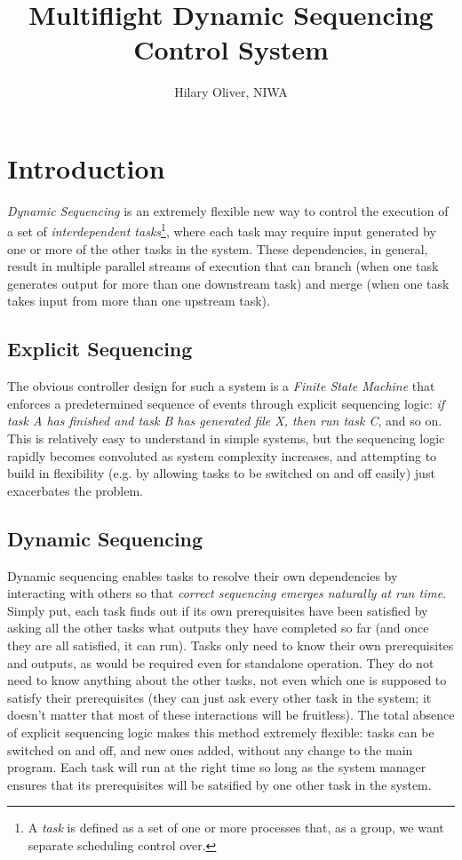 \documentclass[11pt,a4paper]{report}
\title{Multiflight Dynamic Sequencing Control System}
\author{Hilary Oliver, NIWA}
\begin{document}
\maketitle
\tableofcontents


\chapter{Introduction}

{\em Dynamic Sequencing} is an extremely flexible new way to control the
execution of a set of {\em interdependent tasks}\footnote{A {\em task}
is defined as a set of one or more processes that, as a group, we want
separate scheduling control over.}, where each task may require input
generated by one or more of the other tasks in the system. These
dependencies, in general, result in multiple parallel streams of
execution that can branch (when one task generates output for more than
one downstream task) and merge (when one task takes input from more than
one upstream task). 

\section{Explicit Sequencing}

The obvious controller design for such a system is a {\em Finite State
Machine} that enforces a predetermined sequence of events through
explicit sequencing logic: {\em if task A has finished and task B has
generated file X, then run task C}, and so on. This is relatively easy
to understand in simple systems, but the sequencing logic rapidly
becomes convoluted as system complexity increases, and attempting to
build in flexibility (e.g. by allowing tasks to be switched on and off
easily) just exacerbates the problem.

\section{Dynamic Sequencing}

Dynamic sequencing enables tasks to resolve their own dependencies by
interacting with others so that {\em correct sequencing emerges
naturally at run time}. Simply put, each task finds out if its own
prerequisites have been satisfied by asking all the other tasks what
outputs they have completed so far (and once they are all satisfied, it
can run).  Tasks only need to know their own prerequisites and outputs,
as would be required even for standalone operation. They do not need to
know anything about the other tasks, not even which one is supposed to
satisfy their prerequisites (they can just ask every other task in the
system; it doesn't matter that most of these interactions will be
fruitless).  The total absence of explicit sequencing logic makes this
method extremely flexible: tasks can be switched on and off, and new
ones added, without any change to the main program. Each task will run
at the right time so long as the system manager ensures that its
prerequisites will be satsified by one other task in the system.
\end{document}
